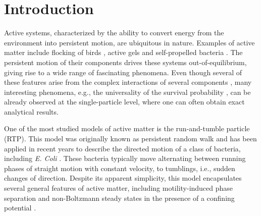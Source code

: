 \documentclass[aps,pre,twocolumn,superscriptaddress,showpacs]{revtex4-1}
\begin{document}
\section{Introduction}
\label{sec:intro}






Active systems, characterized by the ability to convert energy from the environment into persistent motion, are ubiquitous in nature. Examples of active matter include flocking of birds \cite{R10,VCB95,VZ12}, active gels \cite{R10,NVG19} and self-propelled bacteria \cite{TC08,C12,berg_book}. The persistent motion of their components drives these systems out-of-equilibrium, giving rise to a wide range of fascinating phenomena. Even though several of these features arise from the complex interactions of several components \cite{TC08,C12,CT15,BDL16}, many interesting phenomena, e.g., the universality of the survival probability \cite{MLDM20a,MLDM20,DMS21}, can be already observed at the single-particle level, where one can often obtain exact analytical results.


One of the most studied models of active matter is the run-and-tumble particle (RTP). This model was originally known as persistent random walk \cite{kac74,S87,Orshinger90,W02,HJ95,ML17} and has been applied in recent years to describe the directed motion of a class of bacteria, including \emph{E. Coli} \cite{berg_book,C12,TC08,CT15,SFB15}. These bacteria typically move alternating between running phases of straight motion with constant velocity, to tumblings, i.e., sudden changes of direction. Despite its apparent simplicity, this model encapsulates several general features of active matter, including motility-induced phase separation \cite{CT15} and non-Boltzmann steady states in the presence of a confining potential \cite{TC08,DKM18,SAC19,MBE19,BMR20}. 
\end{document}
